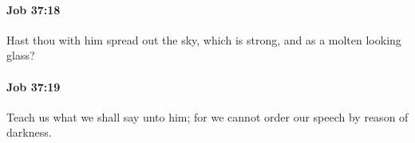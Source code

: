 		\paragraph{Job 37:18} %
			\label{JOB-37-18}

			Hast thou with him spread out the sky, which is strong, and as a molten looking glass?


		\paragraph{Job 37:19} %
			\label{JOB-37-19}

			Teach us what we shall say unto him; for we cannot order our speech by reason of darkness.


